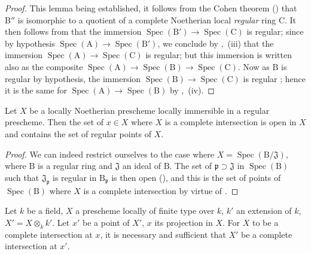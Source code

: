 \begin{proof}
This lemma being established, it follows from the Cohen theorem () that $\mathrm{B}''$ is isomorphic to a quotient of a complete Noetherian local \emph{regular} ring $\mathrm{C}$.
It then follows from  that the immersion $\operatorname{Spec}(\mathrm{B}')\to\operatorname{Spec}(\mathrm{C})$ is regular; since by hypothesis $\operatorname{Spec}(\mathrm{A})\to\operatorname{Spec}(\mathrm{B}')$, we conclude by ,~(iii) that the immersion $\operatorname{Spec}(\mathrm{A})\to\operatorname{Spec}(\mathrm{C})$ is regular; but this immersion is written also as the composite $\operatorname{Spec}(\mathrm{A})\to\operatorname{Spec}(\mathrm{B})\to\operatorname{Spec}(\mathrm{C})$.
Now as $\mathrm{B}$ is regular by hypothesis, the immersion $\operatorname{Spec}(\mathrm{B})\to\operatorname{Spec}(\mathrm{C})$ is regular ; hence it is the same for $\operatorname{Spec}(\mathrm{A})\to\operatorname{Spec}(\mathrm{B})$ by ,~(iv).
\end{proof}

\begin{corollary}[19.3.3]
\label{IV.19.3.3}
Let $X$ be a locally Noetherian prescheme locally immersible in a regular prescheme.
Then the set of $x\in X$ where $X$ is a complete intersection is open in $X$ and contains the set of regular points of $X$.
\end{corollary}

\begin{proof}
We can indeed restrict ourselves to the case where $X=\operatorname{Spec}(\mathrm{B}/\mathfrak{J})$, where $\mathrm{B}$ is a regular ring and $\mathfrak{J}$ an ideal of $\mathrm{B}$.
The set of $\mathfrak{p}\supset\mathfrak{J}$ in $\operatorname{Spec}(\mathrm{B})$ such that $\mathfrak{J}_\mathfrak{p}$ is regular in $\mathrm{B}_\mathfrak{p}$ is then open (), and this is the set of points of $\operatorname{Spec}(\mathrm{B})$ where $X$ is a complete intersection by virtue of .
\end{proof}

\begin{corollary}[19.3.4]
\label{IV.19.3.4}
Let $k$ be a field, $X$ a prescheme locally of finite type over $k$, $k'$ an extension of $k$, $X'=X\otimes_k k'$.
Let $x'$ be a point of $X'$, $x$ its projection in $X$.
For $X$ to be a complete intersection at $x$, it is necessary and sufficient that $X'$ be a complete intersection at $x'$.
\end{corollary}

